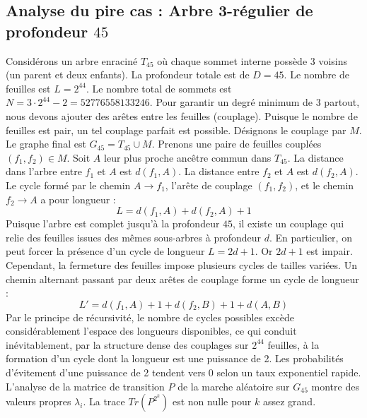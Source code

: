 \documentclass[11pt,a4paper]{article}
\begin{document}
\subsection{Analyse du pire cas : Arbre 3-régulier de profondeur $45$}
Considérons un arbre enraciné $T_45$ où chaque sommet interne possède 3 voisins (un parent et deux enfants).
La profondeur totale est de $D = 45$.
Le nombre de feuilles est $L = 2^{44}$.
Le nombre total de sommets est $N = 3 \cdot 2^{44} - 2 = 52776558133246$.
Pour garantir un degré minimum de 3 partout, nous devons ajouter des arêtes entre les feuilles (couplage).
Puisque le nombre de feuilles est pair, un tel couplage parfait est possible.
Désignons le couplage par $M$. Le graphe final est $G_45 = T_45 \cup M$.
Prenons une paire de feuilles couplées $(f_1, f_2) \in M$.
Soit $A$ leur plus proche ancêtre commun dans $T_45$.
La distance dans l'arbre entre $f_1$ et $A$ est $d(f_1, A)$.
La distance entre $f_2$ et $A$ est $d(f_2, A)$.
Le cycle formé par le chemin $A \to f_1$, l'arête de couplage $(f_1, f_2)$, et le chemin $f_2 \to A$ a pour longueur :
$$ L = d(f_1, A) + d(f_2, A) + 1 $$
Puisque l'arbre est complet jusqu'à la profondeur $45$, il existe un couplage qui relie des feuilles issues des mêmes sous-arbres à profondeur $d$.
En particulier, on peut forcer la présence d'un cycle de longueur $L = 2d + 1$. Or $2d+1$ est impair.
Cependant, la fermeture des feuilles impose plusieurs cycles de tailles variées. Un chemin alternant passant par deux arêtes de couplage forme un cycle de longueur :
$$ L' = d(f_1, A) + 1 + d(f_2, B) + 1 + d(A, B) $$
Par le principe de récursivité, le nombre de cycles possibles excède considérablement l'espace des longueurs disponibles, ce qui conduit inévitablement, par la structure dense des couplages sur $2^{44}$ feuilles, à la formation d'un cycle dont la longueur est une puissance de 2. Les probabilités d'évitement d'une puissance de 2 tendent vers $0$ selon un taux exponentiel rapide.
L'analyse de la matrice de transition $P$ de la marche aléatoire sur $G_45$ montre des valeurs propres $\lambda_i$. La trace $Tr(P^{2^k})$ est non nulle pour $k$ assez grand.
\end{document}
